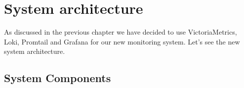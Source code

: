 %

\chapter{System architecture \label{ch4}}

As discussed in the previous chapter we have decided to use VictoriaMetrics,
Loki, Promtail and Grafana for our new monitoring system. Let's see the new
system architecture.

\section{System Components}

